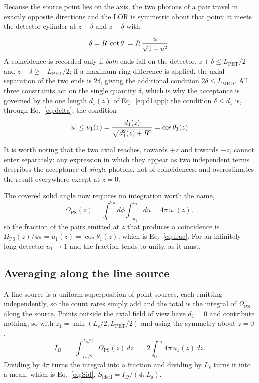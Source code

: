 \documentclass[11pt,a4paper]{article}
\newcommand{\Lpet}{L_{\mathrm{PET}}}
\newcommand{\Lsrc}{L_{\mathrm{s}}}
\newcommand{\Lmrd}{L_{\mathrm{MRD}}}
\newcommand{\Sid}{S_{\mathrm{ideal}}}
\DeclarePairedDelimiter{\abs}{\lvert}{\rvert}
\begin{document}
Because the source point lies on the axis, the two photons of a pair travel in exactly
opposite directions and the LOR is symmetric about that point: it meets the detector
cylinder at $z+\delta$ and $z-\delta$ with
\begin{equation}
  \delta=R\,\abs{\cot\theta}=R\,\frac{\abs{u}}{\sqrt{1-u^{2}}} .
  \label{eq:delta}
\end{equation}
A coincidence is recorded only if \emph{both} ends fall on the detector,
$z+\delta\le \Lpet/2$ and $z-\delta\ge-\Lpet/2$; if a maximum ring difference is applied,
the axial separation of the two ends is $2\delta$, giving the additional condition
$2\delta\le\Lmrd$. All three constraints act on the single quantity $\delta$, which is why
the acceptance is governed by the one length $d_1(z)$ of Eq.~\eqref{eq:d1app}: the condition
$\delta\le d_1$ is, through Eq.~\eqref{eq:delta}, the condition
\begin{equation}
  \abs{u}\le u_1(z)=\frac{d_1(z)}{\sqrt{d_1^2(z)+R^2}}=\cos\theta_1(z) .
  \label{eq:u1}
\end{equation}

It is worth noting that the two axial reaches, towards $+z$ and towards $-z$, cannot enter
separately: any expression in which they appear as two independent terms describes the
acceptance of \emph{single} photons, not of coincidences, and overestimates the result
everywhere except at $z=0$.

The covered solid angle now requires no integration worth the name,
\begin{equation}
  \Omega_{\mathrm{PS}}(z)=\int_0^{2\pi}\!\!d\phi\int_{-u_1}^{u_1}\!\!du = 4\pi\,u_1(z) ,
  \label{eq:omega}
\end{equation}
so the fraction of the pairs emitted at $z$ that produces a coincidence is
$\Omega_{\mathrm{PS}}(z)/4\pi=u_1(z)=\cos\theta_1(z)$, which is Eq.~\eqref{eq:frac}. For an
infinitely long detector $u_1\to1$ and the fraction tends to unity, as it must.

\subsection{Averaging along the line source}

A line source is a uniform superposition of point sources, each emitting independently, so
the count rates simply add and the total is the integral of $\Omega_{\mathrm{PS}}$ along the
source. Points outside the axial field of view have $d_1=0$ and contribute nothing, so with
$z_1=\min(\Lsrc/2,\Lpet/2)$ and using the symmetry about $z=0$,
\begin{equation}
  I_\Omega \;=\; \int_{-\Lsrc/2}^{\Lsrc/2}\!\!\Omega_{\mathrm{PS}}(z)\,dz
  \;=\;2\int_{0}^{z_1} 4\pi\,u_1(z)\,dz .
  \label{eq:Iomega}
\end{equation}
Dividing by $4\pi$ turns the integral into a fraction and dividing by $\Lsrc$ turns it into
a mean, which is Eq.~\eqref{eq:Sid}, $\Sid=I_\Omega/(4\pi \Lsrc)$.
\end{document}
